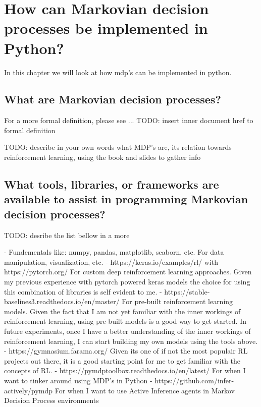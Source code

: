 \section{How can Markovian decision processes be implemented in Python?}

In this chapter we will look at how \gls{mdp}'s can be implemented in python.

\subsection{What are Markovian decision processes?}

For a more formal definition, please see ... TODO: insert inner document href to formal definition

TODO: describe in your own words what MDP's are, its relation towards reinforcement learning, using the book and slides to gather info

\subsection{What tools, libraries, or frameworks are available to assist in programming Markovian decision processes?}

TODO: desribe the list bellow in a more 

- Fundementals like: numpy, pandas, matplotlib, seaborn, etc.
    For data manipulation, visualization, etc.
- https://keras.io/examples/rl/ with https://pytorch.org/
    For custom deep reinforcement learning approaches. 
    Given my previous experience with pytorch powered keras models the choice for using this combination of libraries is self evident to me.
- https://stable-baselines3.readthedocs.io/en/master/
    For pre-built reinforcement learning models. 
    Given the fact that I am not yet familiar with the inner workings of reinforcement learning, using pre-built models is a good way to get started.
    In future experiments, once I have a better understanding of the inner workings of reinforcement learning, I can start building my own models using the tools above.
- https://gymnasium.farama.org/
    Given its one of if not the most populair RL projects out there, it is a good starting point for me to get familiar with the concepts of RL.
- https://pymdptoolbox.readthedocs.io/en/latest/
    For when I want to tinker around using MDP's in Python
- https://github.com/infer-actively/pymdp
    For when I want to use Active Inference agents in Markov Decision Process environments